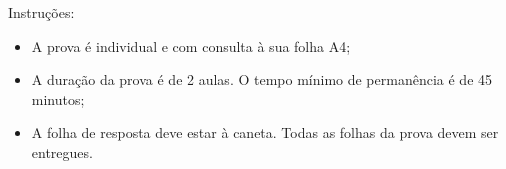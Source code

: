 {\footnotesize
Instruções:
\begin{itemize}
\setlength\itemsep{0em}
\item A prova é individual e com consulta à sua folha A4;
\item A duração da prova é de 2 aulas. O tempo mínimo de permanência é de 45 minutos;
\item A folha de resposta deve estar à caneta. Todas as folhas da prova devem ser entregues.
\end{itemize}
}
